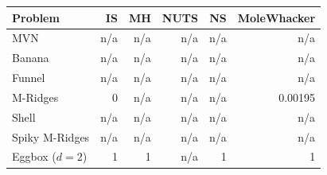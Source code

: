 \begin{tabular}{lrrrrr}
\toprule
Problem & IS & MH & NUTS & NS & MoleWhacker \\
\midrule
MVN & n/a & n/a & n/a & n/a & n/a \\
Banana & n/a & n/a & n/a & n/a & n/a \\
Funnel & n/a & n/a & n/a & n/a & n/a \\
M-Ridges & 0 & n/a & n/a & n/a & 0.00195 \\
Shell & n/a & n/a & n/a & n/a & n/a \\
Spiky M-Ridges & n/a & n/a & n/a & n/a & n/a \\
\midrule
Eggbox ($d=2$) & 1 & 1 & n/a & 1 & 1 \\
\bottomrule
\end{tabular}

